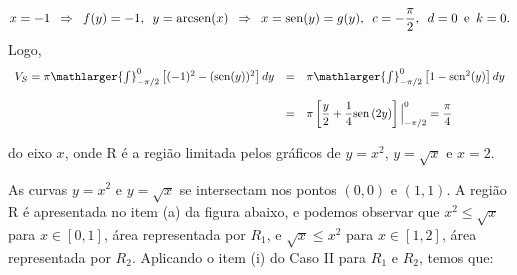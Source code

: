 \cleardoublepage\documentclass[../main.tex]{subfiles}
\begin{document}
\begin{ex}
\begin{compactenum}[a)]
\begin{solution}
\[ x=-1\,\,\, \Rightarrow \,\,\, f(y)=-1,\,\,\,y={\rm arcsen}(x)\,\,\, \Rightarrow \,\,\, x={\rm sen}(y)=g(y), \,\,\, c=-\dfrac{\pi}{2},\,\,\, d=0\,\,\, \mbox{e}\,\,\, k=0. \] Logo, \[ \begin{array}{rclcr} V_S= \pi \mathlarger{\int}^{0}_{-\pi/2}\left[ (-1)^2-({\rm sen}(y))^2\right]dy& =& \pi \mathlarger{\int}^{0}_{-\pi/2}\left[ 1-{\rm sen}^2(y)\right]dy \\ \\ &=& \pi \left[ \dfrac{y}{2} +\dfrac{1}{4}{\rm sen\,}(2y)\right]\Big{|}^{0}_{-\pi/2} = \dfrac{\pi}{4} \end{array} \]
\end{solution}
\item do eixo \(x\), onde R é a região limitada pelos gráficos de \(y=x^2\), \(y=\sqrt{x}\) e \( x=2\).

\begin{solution}
As curvas \(y=x^2\) e \(y=\sqrt{x}\) se intersectam nos pontos \((0,0)\) e \((1,1)\). A região R é apresentada no item (a) da figura abaixo, e podemos observar que \(x^2\leq \sqrt{x}\) para \(x\in[0,1]\), área representada por \(R_1\), e \(\sqrt{x} \leq x^2\) para \(x\in[1,2]\), área representada por \(R_2\). Aplicando o item (i) do Caso II para \(R_1\) e \(R_2\), temos que:


\end{solution}
\end{compactenum}
\end{ex}
\end{document}
